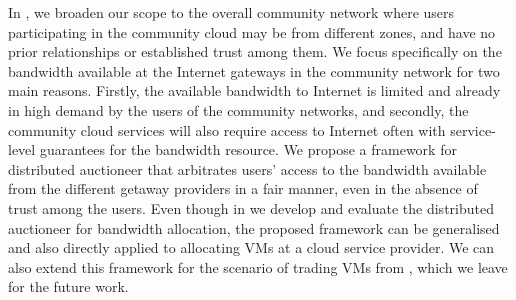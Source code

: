 In , we broaden our scope to the overall community network 
where users participating in the community cloud may be from different zones, 
and have no prior relationships or established trust among them. 
We focus specifically on the bandwidth available at the Internet gateways in the community network for two main reasons.
Firstly, the available bandwidth to Internet is limited and 
already in high demand by the users of the community networks, 
and secondly, the community cloud services will also require access to Internet 
often with service-level guarantees for the bandwidth resource.
We propose a framework for distributed auctioneer that arbitrates users' access to the bandwidth 
available from the different getaway providers in a fair manner, 
even in the absence of trust among the users.
Even though in  we develop and evaluate the distributed auctioneer for bandwidth allocation, 
the proposed framework can be generalised and also directly applied to allocating VMs at a cloud service provider. 
We can also extend this framework for the scenario of trading VMs from , which we leave for the future work.
